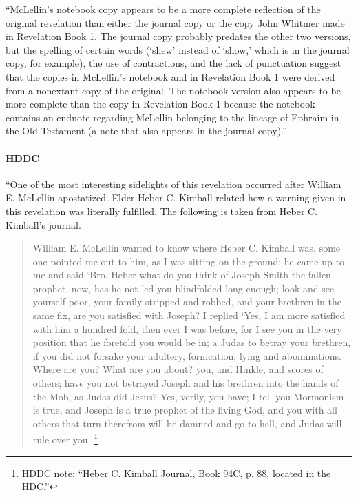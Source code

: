 			``McLellin's notebook copy appears to be a more complete reflection of the original revelation than either the journal copy or the copy John Whitmer made in Revelation Book 1. The journal copy probably predates the other two versions, but the spelling of certain words (`shew' instead of `show,' which is in the journal copy, for example), the use of contractions, and the lack of punctuation suggest that the copies in McLellin's notebook and in Revelation Book 1 were derived from a nonextant copy of the original. The notebook version also appears to be more complete than the copy in Revelation Book 1 because the notebook contains an endnote regarding McLellin belonging to the lineage of Ephraim in the Old Testament (a note that also appears in the journal copy).''
			
		\paragraph{HDDC} 
		
			``One of the most interesting sidelights of this revelation occurred after William E. McLellin apostatized. Elder Heber C. Kimball related how a warning given in this revelation was literally fulfilled. The following is taken from Heber C. Kimball's journal.
			
			\begin{quote}
				William E. McLellin wanted to know where Heber C. Kimball was, some one pointed me out to him, as I was sitting on the ground: he came up to me and said `Bro. Heber what do you think of Joseph Smith the fallen prophet, now, has he not led you blindfolded long enough; look and see yourself poor, your family stripped and robbed, and your brethren in the same fix, are you satisfied with Joseph? I replied `Yes, I am more satisfied with him a hundred fold, then ever I was before, for I see you in the very position that he foretold you would be in; a Judas to betray your brethren, if you did not forsake your adultery, fornication, lying and abominations. Where are you? What are you about? you, and Hinkle, and scores of others; have you not betrayed Joseph and his brethren into the hands of the Mob, as Judas did Jesus? Yes, verily, you have; I tell you Mormonism is true, and Joseph is a true prophet of the living God, and you with all others that turn therefrom will be damned and go to hell, and Judas will rule over you.%
					\footnote{%
						HDDC note: ``Heber C. Kimball Journal, Book 94C, p. 88, located in the HDC.''
						}
			\end{quote}
			
